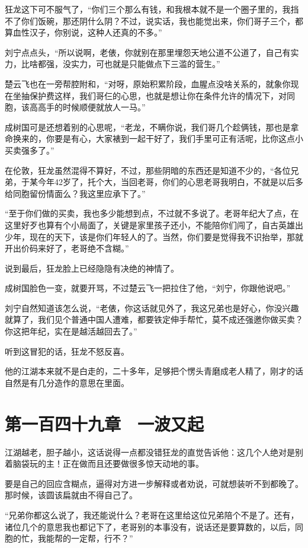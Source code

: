 狂龙这下可不服气了，“你们三个那么有钱，和我根本就不是一个圈子里的，我挡不了你们饭碗，那还阴什么阴？不过，说实话，我也能觉出来，你们哥子三个，都算血性汉子，你别说，这种人还真的不多。”

刘宁点点头，“所以说啊，老俵，你就别在那里埋怨天地公道不公道了，自己有实力，比啥都强，没实力，可也就是只能做点下三滥的营生。”

楚云飞也在一旁帮腔附和，“对呀，原始积累阶段，血腥点没啥关系的，就象你现在坐抽保护费这样，我们哥仨的心思，也就是想让你在条件允许的情况下，对同胞，该高高手的时候顺便就放人一马。”

成树国可是还想着别的心思呢，“老龙，不瞒你说，我们哥几个趁俩钱，那也是拿命换来的，你要是有心，大家裱到一起干好了，我们手里可正有活呢，比你这点小买卖强多了。”

在伦敦，狂龙虽然混得不算好，不过，那些阴暗的东西还是知道不少的，“各位兄弟，于某今年42岁了，托个大，当回老哥，你们的心思老哥我明白，不就是以后多给同胞留份情面么？我这里应承下了。”

“至于你们做的买卖，我也多少能想到点，不过就不多说了。老哥年纪大了点，在这里好歹也算有个小局面了，关键是家里孩子还小，不能陪你们闯了，自古英雄出少年，现在的天下，该是你们年轻人的了。当然，你们要是觉得我不识抬举，那就开出价码来好了，老哥绝不含糊。”

说到最后，狂龙脸上已经隐隐有决绝的神情了。

成树国脸色一变，就要开骂，不过楚云飞一把拉住了他，“刘宁，你跟他说吧。”

刘宁自然知道该怎么说，“老俵，你这话就见外了，我这兄弟也是好心，你没兴趣就算了，我们见个普通中国人遭难，都要铁定伸手帮忙，莫不成还强邀你做买卖？你这把年纪，实在是越活越回去了。”

听到这冒犯的话，狂龙不怒反喜。

他的江湖本来就不是白走的，二十多年，足够把个愣头青磨成老人精了，刚才的话自然是有几分造作的意思在里面。

\section{第一百四十九章　一波又起}

江湖越老，胆子越小，这话说得一点都没错狂龙的直觉告诉他：这几个人绝对是别着脑袋玩的主！正在做而且还要做很多惊天动地的事。

要是自己的回应含糊点，逼得对方进一步解释或者劝说，可就想装听不到都晚了。那时候，该圆该扁就由不得自己了。

“兄弟你都这么说了，我还能说什么？老哥在这里给这位兄弟陪个不是了。还有，诸位几个的意思我也都记下了，老哥别的本事没有，说话还是要算数的，以后，同胞的忙，我能帮的一定帮，行不？”

